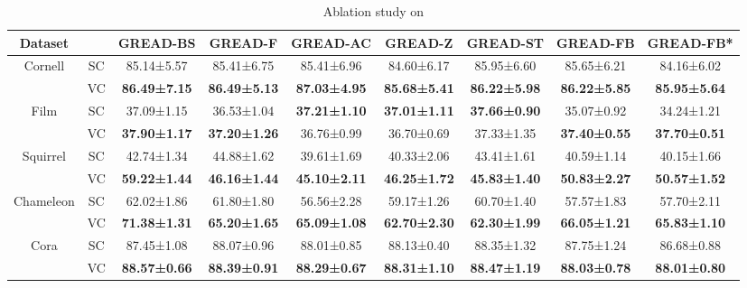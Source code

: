 \documentclass{article}
\theoremstyle{plain}
\theoremstyle{definition}
\theoremstyle{remark}
\newcommand{\std}{\scriptsize{}}
\begin{document}
\begin{table}[h!]
     \small
     \centering
\caption{Ablation study on }
     \label{tab:beta_appendix}
     \begin{tabular}{cc cccc ccc}\toprule
        Dataset &  &  GREAD-BS & GREAD-F & GREAD-AC & GREAD-Z & GREAD-ST & GREAD-FB & GREAD-FB*\\
        \midrule \multirow{2}{*}{Cornell}
        & SC    &  85.14\std{±5.57} & 85.41\std{±6.75} & 85.41\std{±6.96} & 84.60\std{±6.17} & 85.95\std{±6.60} & 85.65\std{±6.21} & 84.16\std{±6.02}\\
        & VC    &  \textbf{86.49\std{±7.15}} & \textbf{86.49\std{±5.13}} & \textbf{87.03\std{±4.95}} & \textbf{85.68\std{±5.41}} & \textbf{86.22\std{±5.98}} & \textbf{86.22\std{±5.85}} & \textbf{85.95\std{±5.64}}\\
        \midrule \multirow{2}{*}{Film}
        & SC    &  37.09\std{±1.15} & 36.53\std{±1.04} & \textbf{37.21\std{±1.10}} & \textbf{37.01\std{±1.11}} & \textbf{37.66\std{±0.90}} & 35.07\std{±0.92} & 34.24\std{±1.21}\\
        & VC    &  \textbf{37.90\std{±1.17}} & \textbf{37.20\std{±1.26}} & 36.76\std{±0.99} & 36.70\std{±0.69} & 37.33\std{±1.35} & \textbf{37.40\std{±0.55}} & \textbf{37.70\std{±0.51}}\\
        \midrule \multirow{2}{*}{Squirrel}
        & SC    &  42.74\std{±1.34} & 44.88\std{±1.62} & 39.61\std{±1.69} & 40.33\std{±2.06} & 43.41\std{±1.61} & 40.59\std{±1.14} & 40.15\std{±1.66}\\
        & VC    &  \textbf{59.22\std{±1.44}} & \textbf{46.16\std{±1.44}} & \textbf{45.10\std{±2.11}} & \textbf{46.25\std{±1.72}} & \textbf{45.83\std{±1.40}} & \textbf{50.83\std{±2.27}} & \textbf{50.57\std{±1.52}}\\
        \midrule \multirow{2}{*}{Chameleon}
        & SC    & 62.02\std{±1.86} & 61.80\std{±1.80} & 56.56\std{±2.28} & 59.17\std{±1.26} & 60.70\std{±1.40} & 57.57\std{±1.83} & 57.70\std{±2.11} \\
        & VC    & \textbf{71.38\std{±1.31}} & \textbf{65.20\std{±1.65}} & \textbf{65.09\std{±1.08}} & \textbf{62.70\std{±2.30}} & \textbf{62.30\std{±1.99}} & \textbf{66.05\std{±1.21}} & \textbf{65.83\std{±1.10}} \\
        \midrule \multirow{2}{*}{Cora}
        & SC    &  87.45\std{±1.08} & 88.07\std{±0.96} & 88.01\std{±0.85} & 88.13\std{±0.40} & 88.35\std{±1.32} & 87.75\std{±1.24} & 86.68\std{±0.88} \\
        & VC    &  \textbf{88.57\std{±0.66}} & \textbf{88.39\std{±0.91}} & \textbf{88.29\std{±0.67}} & \textbf{88.31\std{±1.10}} & \textbf{88.47\std{±1.19}} & \textbf{88.03\std{±0.78}} & \textbf{88.01\std{±0.80}} \\

\end{tabular}
\end{table}
\end{document}
